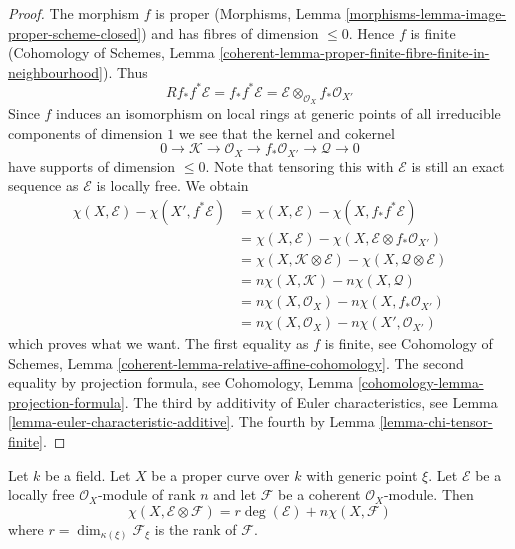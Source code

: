 \begin{proof}
The morphism $f$ is proper
(Morphisms, Lemma \ref{morphisms-lemma-image-proper-scheme-closed})
and has fibres of dimension $\leq 0$. Hence $f$ is finite
(Cohomology of Schemes, Lemma
\ref{coherent-lemma-proper-finite-fibre-finite-in-neighbourhood}).
Thus
$$
Rf_*f^*\mathcal{E} = f_*f^*\mathcal{E} =
\mathcal{E} \otimes_{\mathcal{O}_X} f_*\mathcal{O}_{X'}
$$
Since $f$ induces an isomorphism on local rings at generic points of
all irreducible components of dimension $1$ we see that the kernel
and cokernel
$$
0 \to \mathcal{K} \to \mathcal{O}_X \to f_*\mathcal{O}_{X'}
\to \mathcal{Q} \to 0
$$
have supports of dimension $\leq 0$. Note that tensoring this with
$\mathcal{E}$ is still an exact sequence as $\mathcal{E}$ is locally free.
We obtain
\begin{align*}
\chi(X, \mathcal{E}) - \chi(X', f^*\mathcal{E})
& =
\chi(X, \mathcal{E}) - \chi(X, f_*f^*\mathcal{E}) \\
& =
\chi(X, \mathcal{E}) - \chi(X, \mathcal{E} \otimes f_*\mathcal{O}_{X'}) \\
& =
\chi(X, \mathcal{K} \otimes \mathcal{E}) -
\chi(X, \mathcal{Q} \otimes \mathcal{E}) \\
& =
n\chi(X, \mathcal{K}) -
n\chi(X, \mathcal{Q}) \\
& =
n\chi(X, \mathcal{O}_X) - n\chi(X, f_*\mathcal{O}_{X'}) \\
& =
n\chi(X, \mathcal{O}_X) - n\chi(X', \mathcal{O}_{X'})
\end{align*}
which proves what we want. The first equality as $f$ is finite, see
Cohomology of Schemes, Lemma \ref{coherent-lemma-relative-affine-cohomology}.
The second equality by projection formula, see
Cohomology, Lemma \ref{cohomology-lemma-projection-formula}.
The third by additivity of Euler characteristics, see
Lemma \ref{lemma-euler-characteristic-additive}.
The fourth by Lemma \ref{lemma-chi-tensor-finite}.
\end{proof}

\begin{lemma}
\label{lemma-degree-on-proper-curve}
Let $k$ be a field. Let $X$ be a proper curve over $k$ with generic point
$\xi$. Let $\mathcal{E}$ be a locally free $\mathcal{O}_X$-module of rank $n$
and let $\mathcal{F}$ be a coherent $\mathcal{O}_X$-module. Then
$$
\chi(X, \mathcal{E} \otimes \mathcal{F}) =
r \deg(\mathcal{E}) + n \chi(X, \mathcal{F})
$$
where $r = \dim_{\kappa(\xi)} \mathcal{F}_\xi$ is the rank of $\mathcal{F}$.
\end{lemma}

